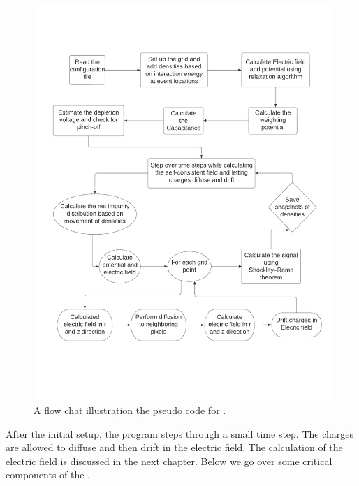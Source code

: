 \begin{figure}[!htb]
\centering
\includegraphics[width=0.99\linewidth,trim={2pc 10pc 1.5pc 9pc},clip]{ch3/figs/ehd_flowchart.pdf}
\caption{A flow chat illustration the pseudo code for {\ehd}.}
\label{fig:ehd_flowchart}
\end{figure}


After the initial setup, the program steps through a small time step. The charges are allowed to diffuse and then drift in the electric field. The calculation of the electric field is discussed in the next chapter. Below we go over some critical components of the {\ehd}.


